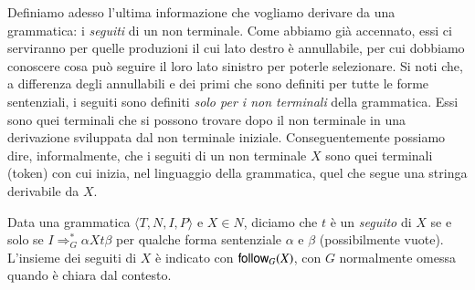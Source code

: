 Definiamo adesso l'ultima informazione che vogliamo derivare da una grammatica:
i \emph{seguiti} di un non terminale. Come abbiamo gi\`a accennato,
essi ci serviranno per quelle produzioni il cui lato destro \`e annullabile,
per cui dobbiamo conoscere cosa pu\`o seguire il loro lato sinistro per
poterle selezionare. Si noti che, a differenza degli annullabili
e dei primi che sono definiti per tutte le forme sentenziali, i seguiti sono
definiti \emph{solo per i non terminali} della grammatica. Essi sono quei
terminali che si possono trovare dopo il non terminale in una derivazione
sviluppata dal non terminale iniziale. Conseguentemente possiamo dire,
informalmente, che
i seguiti di un non terminale $X$ sono quei terminali (token)
con cui inizia, nel linguaggio della grammatica,
quel che segue una stringa derivabile da $X$.
%
\begin{definition}\label{def:follow}
Data una grammatica $\langle T,N,I,P\rangle$ e $X\in N$,
diciamo che $t$ \`e un \emph{seguito} di $X$ se e solo se
$I\Rightarrow^*_G\alpha Xt\beta$ per qualche forma sentenziale
$\alpha$ e $\beta$ (possibilmente vuote). L'insieme dei seguiti di
$X$ \`e indicato con $\mathsf{follow}_G(X)$, con $G$ normalmente omessa quando
\`e chiara dal contesto.
\end{definition}

